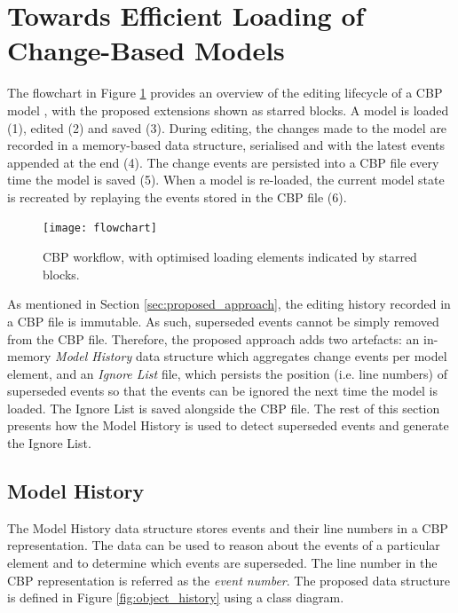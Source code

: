 \section{Towards Efficient Loading of Change-Based Models}
\label{sec:loading_time_optimisation}

The flowchart in Figure \ref{fig:flowchart} provides an overview of the editing lifecycle of a CBP model \cite{DBLP:conf/models/YohannisKP17}, with the proposed extensions shown as starred blocks. A model is loaded (1), edited (2) and saved (3).  During editing, the changes made to the model are recorded in a memory-based data structure, serialised and with the latest events appended at the end (4). The change events are persisted into a CBP file every time the model is saved (5). When a model is re-loaded, the current model state is recreated by replaying the events stored in the CBP file (6).

\begin{figure}[ht]
\centering
\texttt{[image: flowchart]}
\caption{CBP workflow, with optimised loading elements indicated by starred blocks.}
\label{fig:flowchart}
\end{figure}

As mentioned in Section \ref{sec:proposed_approach}, the editing history recorded in a CBP file is immutable. As such, superseded events cannot be simply removed from the CBP file. Therefore, the proposed approach adds two artefacts: an in-memory \textit{Model History} data structure which aggregates change events per model element, and an \textit{Ignore List} file, which persists the position (i.e. line numbers) of superseded events so that the events can be ignored the next time the model is loaded. The Ignore List is saved alongside the CBP file. The rest of this section presents how the Model History is used to detect superseded events and generate the Ignore List.

\subsection{Model History}
\label{subsec:model_history}
The Model History data structure stores events and their line numbers in a CBP representation.  The data can be used to reason about the events of a particular element and to determine which events are superseded. The line number in the CBP representation is referred as the \textit{event number}. The proposed data structure is defined in Figure \ref{fig:object_history} using a class diagram.  

